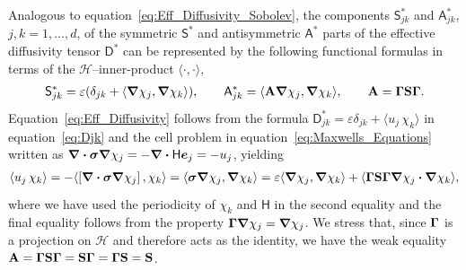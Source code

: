 \documentclass[leqno,onefignum,onetabnum]{siamltex1213}
\newcommand{\Tb}{\mathbf{T}}
\newcommand{\Sb}{\mathbf{S}}
\newcommand{\Ab}{\mathbf{A}}
\newcommand{\bI}{\mathbf{I}}
\newcommand{\Hc}{\mathcal{H}}
\newcommand{\Dm}{\mathsf{D}}
\newcommand{\Hm}{\mathsf{H}}
\newcommand{\Sm}{\mathsf{S}}
\newcommand{\Am}{\mathsf{A}}
\newcommand\bsig{\mbox{\boldmath${\sigma}$}}
\newcommand\bGamma{\mbox{\boldmath${\Gamma}$}}
\newcommand\bnabla{\mbox{\boldmath${\nabla}$}}
\providecommand\bcdot{\boldsymbol{\cdot}}
\newcommand{\vece}{\boldsymbol{e}}
\begin{document}
Analogous to equation~\eqref{eq:Eff_Diffusivity_Sobolev}, the
components $\Sm^*_{jk}$ and $\Am^*_{jk}$, $j,k=1,\ldots,d$, of the
symmetric $\Sm^*$ and antisymmetric $\Am^*$ parts of the effective
diffusivity tensor $\Dm^*$ can be represented by the following
functional formulas in terms of the $\Hc$--inner-product $\langle\cdot,\cdot\rangle$,
%
\begin{align}\label{eq:Eff_Diffusivity}
 \Sm^*_{jk}=\varepsilon(\delta_{jk}+\langle\bnabla \chi_j,\bnabla \chi_k\rangle), 
  \qquad
 \Am^*_{jk}=\langle\Ab\bnabla \chi_j,\bnabla \chi_k\rangle, 
  \qquad
 \Ab=\bGamma\Sb\bGamma.
\end{align}
%
Equation~\eqref{eq:Eff_Diffusivity} follows from the formula
$\Dm^*_{jk}=\varepsilon\delta_{jk}+\langle u_j\,\chi_k\rangle$ in equation~\eqref{eq:Djk} and the
cell problem in equation~\eqref{eq:Maxwells_Equations} written as
$\bnabla\bcdot\bsig\bnabla\chi_j=-\bnabla\bcdot\Hm\vece_j=-u_j$, yielding 
%
\begin{align}\label{eq:Functional_Rep}
  \langle u_j\,\chi_k\rangle=-\langle[\bnabla\bcdot\bsig\bnabla\chi_j]\,,\chi_k\rangle
       =\langle\bsig\bnabla\chi_j,\bnabla\chi_k\rangle      
       =\varepsilon\langle\bnabla\chi_j,\bnabla\chi_k\rangle
         +\langle\bGamma\Sb\bGamma\bnabla\chi_j\bcdot\bnabla\chi_k\rangle,       
\end{align}
%
where we have used the periodicity of $\chi_k$ and $\Hm$ in the second
equality and the final equality follows from the property
$\bGamma\bnabla\chi_j=\bnabla\chi_j$. We stress that, since $\bGamma$ is a
projection on $\Hc$ and therefore acts as the identity, we have the
weak equality $\Ab=\bGamma\Sb\bGamma=\Sb\bGamma=\bGamma\Sb=\Sb$.
\end{document}
